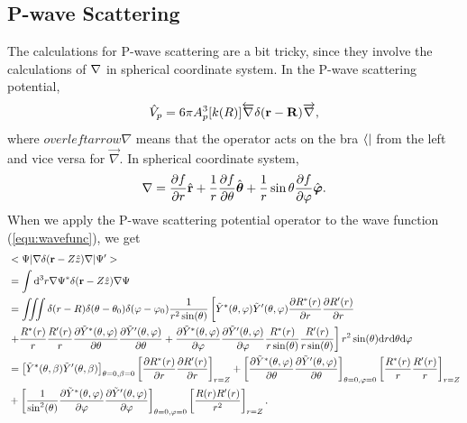\documentclass[british,english]{article}
\numberwithin{equation}{section}
\numberwithin{figure}{section}
\begin{document}
\subsection{P-wave Scattering}
The calculations for P-wave scattering are a bit tricky, since they involve the calculations of ${\bf \nabla}$ in spherical coordinate system. In the P-wave scattering potential, 
\begin{equation}
\hat{V}_p = 6\pi A_{p}^{3}[k(R)]\overleftarrow{\nabla}\delta({\bf r}-{\bf R})\overrightarrow{\nabla},
\end{equation} 
where $overleftarrow{\nabla}$ means that the operator acts on the bra $\bra{}$ from the left and vice versa for $\overrightarrow{\nabla}$. In spherical coordinate system, 
\begin{equation}
\begin{aligned}
{\bf \nabla}={\frac{\partial f}{\partial r}}\hat{\mathbf r}
+ {\frac{1}{r}}{\frac{\partial f}{\partial \theta}}\hat{\boldsymbol \theta}
+ {\frac{1}{r}\sin\theta}{\frac{\partial f}{\partial \varphi}}\hat{\boldsymbol \varphi}.
\end{aligned}
\end{equation}
When we apply the P-wave scattering potential operator to the wave function (\ref{equ:wavefunc}), we get 
\begin{equation}
\begin{aligned}
& <\Psi|\nabla\delta({\bf r}-Z{\hat z})\nabla|\Psi'>\\
&= \int\mathrm d^3r\nabla\Psi^*\delta({\bf r}-Z{\hat z})\nabla \Psi \\
&= \iiint \delta(r-R)\delta(\theta-\theta_0)\delta(\varphi-\varphi_0)\frac{1}{r^2\sin(\theta)}\left[\tilde{Y}^*(\theta,\varphi)\tilde{Y}'(\theta,\varphi)\frac{\partial R^*(r)}{\partial r}\frac{\partial R'(r)}{\partial r}\right.\\
&\left.+\frac{R^*(r)}{r}\frac{R'(r)}{r}\frac{\partial \tilde{Y}^*(\theta,\varphi)}{\partial \theta}\frac{\partial \tilde{Y}'(\theta,\varphi)}{\partial \theta}+\frac{\partial \tilde{Y}^*(\theta,\varphi)}{\partial \varphi}\frac{\partial \tilde{Y}'(\theta,\varphi)}{\partial \varphi}\frac{R^*(r)}{r\sin(\theta)}\frac{R'(r)}{r\sin(\theta)}\right]r^2\sin(\theta)\mathrm d r \mathrm d \theta \mathrm d\varphi \\
&=\left[\tilde{Y}^*(\theta,\beta)\tilde{Y}'(\theta,\beta)\right]_{\theta=0,\beta=0}\left[\frac{\partial R^*(r)}{\partial r}\frac{\partial R'(r)}{\partial r}\right]_{r=Z}+\left[\frac{\partial \tilde{Y}^*(\theta,\varphi)}{\partial \theta}\frac{\partial \tilde{Y}'(\theta,\varphi)}{\partial \theta}\right]_{\theta=0,\varphi=0}\left[\frac{R^*(r)}{r}\frac{R'(r)}{r}\right]_{r=Z}\\
&+\left[\frac{1}{\sin^2(\theta)}\frac{\partial \tilde{Y}^*(\theta,\varphi)}{\partial \varphi}\frac{\partial \tilde{Y}'(\theta,\varphi)}{\partial \varphi}\right]_{\theta=0,\varphi=0}\left[\frac{R(r)R'(r)}{r^2}\right]_{r=Z}.
\end{aligned}
\end{equation}
\end{document}
